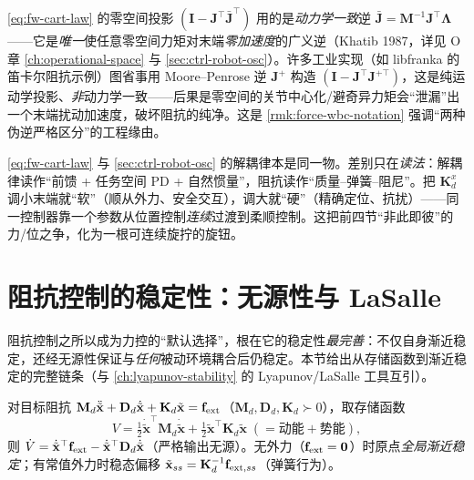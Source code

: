 \begin{remark}
\label{rmk:fw-nullspace}
\cref{eq:fw-cart-law} 的零空间投影 $(\mathbf{I}-\mathbf{J}^\top\bar{\mathbf{J}}^\top)$ 用的是\emph{动力学一致}逆 $\bar{\mathbf{J}}=\mathbf{M}^{-1}\mathbf{J}^\top\boldsymbol{\Lambda}$——它是\emph{唯一}使任意零空间力矩对末端\emph{零加速度}的广义逆（Khatib 1987\cite{khatib1987operational}，详见 O 章 \cref{ch:operational-space} 与 \cref{sec:ctrl-robot-osc}）。许多工业实现（如 libfranka 的笛卡尔阻抗示例）图省事用 Moore--Penrose 逆 $\mathbf{J}^+$ 构造 $(\mathbf{I}-\mathbf{J}^\top\mathbf{J}^{+\top})$，这是纯运动学投影、\emph{非}动力学一致——后果是零空间的关节中心化/避奇异力矩会“泄漏”出一个末端扰动加速度，破坏阻抗的纯净。这是 \cref{rmk:force-wbc-notation} 强调“两种伪逆严格区分”的工程缘由。
\end{remark}

\begin{insight}
\label{ins:fw-impedance-read}
\cref{eq:fw-cart-law} 与 \cref{sec:ctrl-robot-osc} 的解耦律本是同一物。差别只在\emph{读法}：解耦律读作“前馈 + 任务空间 PD + 自然惯量”，阻抗读作“质量--弹簧--阻尼”。把 $\mathbf{K}_d^x$ 调小末端就“软”（顺从外力、安全交互），调大就“硬”（精确定位、抗扰）——同一控制器靠一个参数从位置控制\emph{连续}过渡到柔顺控制。这把前四节“非此即彼”的力/位之争，化为一根可连续旋拧的旋钮。
\end{insight}

\section{阻抗控制的稳定性：无源性与 LaSalle}
\label{sec:fw-passivity}

阻抗控制之所以成为力控的“默认选择”，根在它的稳定性\emph{最完善}：不仅自身渐近稳定，还经无源性保证与\emph{任何}被动环境耦合后仍稳定。本节给出从存储函数到渐近稳定的完整链条（与 \cref{ch:lyapunov-stability} 的 Lyapunov/LaSalle 工具互引）。

\begin{theorem}[笛卡尔阻抗的无源性与渐近稳定]
\label{thm:fw-passivity}
对目标阻抗 $\mathbf{M}_d\ddot{\tilde{\mathbf{x}}}+\mathbf{D}_d\dot{\tilde{\mathbf{x}}}+\mathbf{K}_d\tilde{\mathbf{x}}=\mathbf{f}_{\rm ext}$（$\mathbf{M}_d,\mathbf{D}_d,\mathbf{K}_d\succ0$），取存储函数
\begin{equation}
  V=\tfrac12\dot{\tilde{\mathbf{x}}}^\top\mathbf{M}_d\dot{\tilde{\mathbf{x}}}+\tfrac12\tilde{\mathbf{x}}^\top\mathbf{K}_d\tilde{\mathbf{x}}\;(=\text{动能}+\text{势能}),
  \label{eq:fw-storage}
\end{equation}
则 $\dot V=\dot{\tilde{\mathbf{x}}}^\top\mathbf{f}_{\rm ext}-\dot{\tilde{\mathbf{x}}}^\top\mathbf{D}_d\dot{\tilde{\mathbf{x}}}$（严格输出无源）。无外力（$\mathbf{f}_{\rm ext}=\mathbf{0}$）时原点\emph{全局渐近稳定}；有常值外力时稳态偏移 $\tilde{\mathbf{x}}_{ss}=\mathbf{K}_d^{-1}\mathbf{f}_{{\rm ext},ss}$（弹簧行为）。
\end{theorem}

